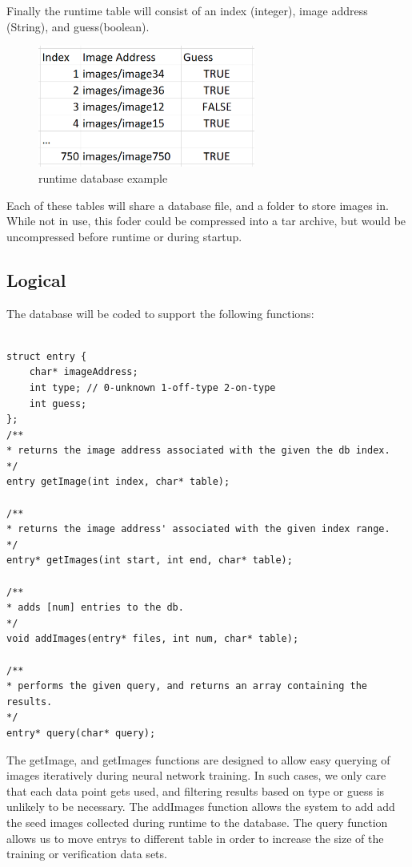 Finally the runtime table will consist of an index (integer), image address (String), and guess(boolean).

\begin{figure}[h]
\caption{runtime database example}
\centering
\includegraphics[height=4cm]{runtimedb}
\end{figure}

Each of these tables will share a database file, and a folder to store images in.
While not in use, this foder could be compressed into a tar archive, but would be uncompressed before runtime or during startup.




\subsection{Logical}

The database will be coded to support the following functions:

\begin{verbatim}

struct entry {
	char* imageAddress;
	int type; // 0-unknown 1-off-type 2-on-type 
	int guess;
};
/**
* returns the image address associated with the given the db index.
*/
entry getImage(int index, char* table);

/**
* returns the image address' associated with the given index range.
*/
entry* getImages(int start, int end, char* table);

/**
* adds [num] entries to the db.
*/
void addImages(entry* files, int num, char* table);

/**
* performs the given query, and returns an array containing the results.
*/
entry* query(char* query);

\end{verbatim}

The getImage, and getImages functions are designed to allow easy querying of images iteratively during neural network training. In such cases, we only care that each data point gets used, and filtering results based on type or guess is unlikely to be necessary.
The addImages function allows the system to add add the seed images collected during runtime to the database.
The query function allows us to move entrys to different table in order to increase the size of the training or verification data sets. 

